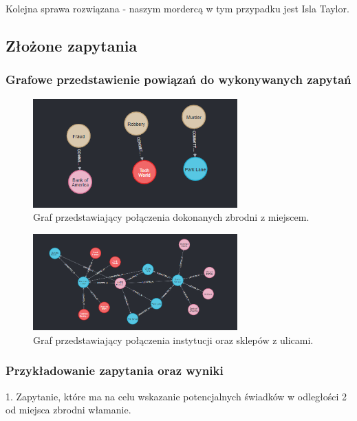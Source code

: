 \documentclass[a4paper,12pt]{article}
\begin{document}
Kolejna sprawa rozwiązana - naszym mordercą w tym przypadku jest Isla Taylor.

\subsection{Złożone zapytania}

\subsubsection{Grafowe przedstawienie powiązań do wykonywanych zapytań}

\begin{figure}[h!]
    \centering
    \includegraphics[width=0.7\textwidth]{commited_at.png}
    \caption{Graf przedstawiający połączenia dokonanych zbrodni z miejscem.}
    \label{fig:commited_at}
\end{figure}

\begin{figure}[h!]
    \centering
    \includegraphics[width=0.7\textwidth]{located_at.png}
    \caption{Graf przedstawiający połączenia instytucji oraz sklepów z ulicami.}
    \label{fig:located_at}
\end{figure}

\subsubsection{Przykładowanie zapytania oraz wyniki}

1. Zapytanie, które ma na celu wskazanie potencjalnych świadków w odległości 2 od miejsca zbrodni włamanie.
\end{document}
